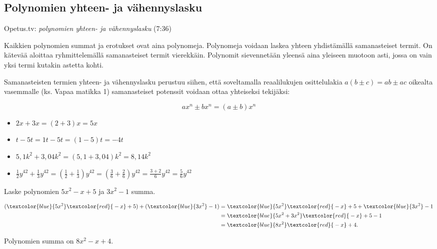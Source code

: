 \subsection*{Polynomien yhteen- ja vähennyslasku}

{Opetus.tv: \emph{polynomien yhteen- ja vähennyslasku} (7:36)}

Kaikkien polynomien summat ja erotukset ovat aina polynomeja. Polynomeja voidaan laskea yhteen yhdistämällä samanasteiset termit. On kätevää aloittaa ryhmittelemällä samanasteiset termit vierekkäin. Polynomit sievennetään yleensä aina yleiseen muotoon asti, jossa on vain yksi termi kutakin astetta kohti.

Samanasteisten termien yhteen- ja vähennyslasku perustuu siihen, että soveltamalla reaalilukujen osittelulakia $a(b\pm c)=ab\pm ac$ oikealta vasemmalle (ks. Vapaa matikka 1) samanasteiset potenssit voidaan ottaa yhteiseksi tekijäksi:

\[ ax^n \pm bx^n = (a \pm b)x^n \]

\begin{esimerkki}

	\begin{itemize}
	\item $2x+3x=(2+3)x=5x$
	\item $t-5t=1t-5t=(1-5)t=-4t$
	\item $5,1k^2+3,04k^2 = (5,1+3,04)k^2 = 8,14k^2$
	\item $\frac{1}{2}y^{42}+\frac{1}{3}y^{42}=(\frac{1}{2}+\frac{1}{3})y^{42}= (\frac{3}{6}+\frac{2}{6})y^{42}=\frac{3+2}{6}y^{42}=\frac{5}{6}y^{42}$
	\end{itemize}
\end{esimerkki}

\begin{esimerkki}
Laske polynomien $5x^2-x+5$ ja $3x^2-1$ summa.
    \begin{esimratk}
    
        \begin{align*}
            (\textcolor{blue}{5x^2} \textcolor{red}{{}-x} + 5) + (\textcolor{blue}{3x^2} -1) 
            &=\textcolor{blue}{5x^2} \textcolor{red}{{}-x} + 5 + \textcolor{blue}{3x^2} -1 \\
            &=\textcolor{blue}{5x^2+3x^2} \textcolor{red}{{}-x} +5-1\\
            &=\textcolor{blue}{8x^2} \textcolor{red}{{}-x}+4.
        \end{align*}     
    \end{esimratk}
    \begin{esimvast}
        Polynomien summa on $8x^2-x+4$.
    \end{esimvast}
\end{esimerkki}

